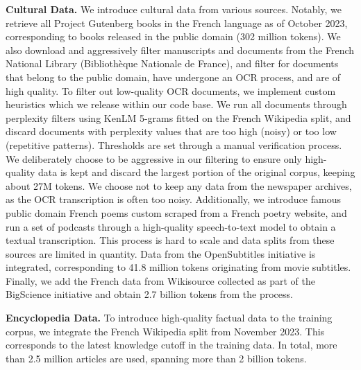 \textbf{Cultural Data.} We introduce cultural data from various sources. Notably, we retrieve all Project Gutenberg  books in the French language as of October 2023, corresponding to books released in the public domain (302 million tokens). We also download and aggressively filter manuscripts and documents from the French National Library (Bibliothèque Nationale de France), and filter for documents that belong to the public domain, have undergone an OCR process, and are of high quality. To filter out low-quality OCR documents, we implement custom heuristics which we release within our code base.
We run all documents through perplexity filters using KenLM 5-grams fitted on the French Wikipedia split, and discard documents with perplexity values that are too high (noisy) or too low (repetitive patterns).
Thresholds are set through a manual verification process.
We deliberately choose to be aggressive in our filtering to ensure only high-quality data is kept and discard the largest portion of the original corpus, keeping about 27M tokens. We choose not to keep any data from the newspaper archives, as the OCR transcription is often too noisy. Additionally, we introduce famous public domain French poems custom scraped from a French poetry website, and run a set of podcasts through a high-quality speech-to-text model to obtain a textual transcription. This process is hard to scale and data splits from these sources are limited in quantity.
Data from the OpenSubtitles initiative is integrated, corresponding to 41.8 million tokens originating from movie subtitles. Finally, we add the French data from Wikisource collected as part of the BigScience initiative  and obtain 2.7 billion tokens from the process.


\textbf{Encyclopedia Data.} To introduce high-quality factual data to the training corpus, we integrate the French Wikipedia split from November 2023. This corresponds to the latest knowledge cutoff in the training data. In total, more than 2.5 million articles are used, spanning more than 2 billion tokens.

